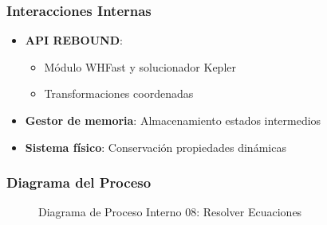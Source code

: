 \subsubsection{Interacciones Internas}
\begin{itemize}
    \item \textbf{API REBOUND}:
    \begin{itemize}
        \item Módulo WHFast y solucionador Kepler
        \item Transformaciones coordenadas
    \end{itemize}
    \item \textbf{Gestor de memoria}: Almacenamiento estados intermedios
    \item \textbf{Sistema físico}: Conservación propiedades dinámicas
\end{itemize}
\newpage
\subsubsection{Diagrama del Proceso}
\begin{figure}[H]
    \centering
        \caption{Diagrama de Proceso Interno 08: Resolver Ecuaciones}%
    \label{fig:process_diagram08}
\end{figure}
\newpage